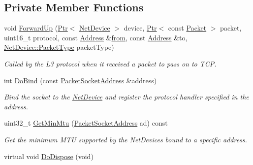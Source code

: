 \subsection*{Private Member Functions}
\begin{DoxyCompactItemize}
\item 
void \hyperlink{classns3_1_1PacketSocket_a889f1446a549aecd23e6f442791ae6b7}{Forward\+Up} (\hyperlink{classns3_1_1Ptr}{Ptr}$<$ \hyperlink{classns3_1_1NetDevice}{Net\+Device} $>$ device, \hyperlink{classns3_1_1Ptr}{Ptr}$<$ const \hyperlink{classns3_1_1Packet}{Packet} $>$ packet, uint16\+\_\+t protocol, const \hyperlink{classns3_1_1Address}{Address} \&\hyperlink{lte__amc_8m_a1b4c81ff74eb1a626b5ade44c81004b3}{from}, const \hyperlink{classns3_1_1Address}{Address} \&to, \hyperlink{classns3_1_1NetDevice_ace65153f09144f55a0d3e702fc29d6b2}{Net\+Device\+::\+Packet\+Type} packet\+Type)
\begin{DoxyCompactList}\small\item\em Called by the L3 protocol when it received a packet to pass on to T\+CP. \end{DoxyCompactList}\item 
int \hyperlink{classns3_1_1PacketSocket_a53aa1ab0fc18ef2d3389585f0440e181}{Do\+Bind} (const \hyperlink{classns3_1_1PacketSocketAddress}{Packet\+Socket\+Address} \&address)
\begin{DoxyCompactList}\small\item\em Bind the socket to the \hyperlink{classns3_1_1NetDevice}{Net\+Device} and register the protocol handler specified in the address. \end{DoxyCompactList}\item 
uint32\+\_\+t \hyperlink{classns3_1_1PacketSocket_a3601a739034d0d2e46ccc45f2073e02f}{Get\+Min\+Mtu} (\hyperlink{classns3_1_1PacketSocketAddress}{Packet\+Socket\+Address} ad) const 
\begin{DoxyCompactList}\small\item\em Get the minimum M\+TU supported by the Net\+Devices bound to a specific address. \end{DoxyCompactList}\item 
virtual void \hyperlink{classns3_1_1PacketSocket_a1137ff2a8fcc74682b220c059642ee28}{Do\+Dispose} (void)
\end{DoxyCompactItemize}
